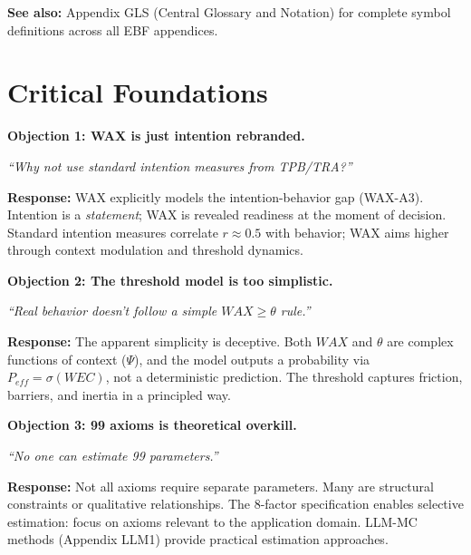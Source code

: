 \textbf{See also:} Appendix GLS (Central Glossary and Notation) for complete symbol definitions across all EBF appendices.


\section{Critical Foundations}
\label{sec:av-foundations}

\begin{tcolorbox}[colback=red!5!white, colframe=red!75!black,
    title=\textbf{Critical Foundations: Objections and Responses}]

\textbf{Objection 1: WAX is just intention rebranded.}

\textit{``Why not use standard intention measures from TPB/TRA?''}

\textbf{Response:} WAX explicitly models the intention-behavior gap (WAX-A3).
Intention is a \emph{statement}; WAX is revealed readiness at the moment of decision.
Standard intention measures correlate $r \approx 0.5$ with behavior; WAX aims higher
through context modulation and threshold dynamics.

\medskip

\textbf{Objection 2: The threshold model is too simplistic.}

\textit{``Real behavior doesn't follow a simple $WAX \geq \theta$ rule.''}

\textbf{Response:} The apparent simplicity is deceptive. Both $WAX$ and $\theta$ are
complex functions of context ($\Psi$), and the model outputs a probability via
$P_{eff} = \sigma(WEC)$, not a deterministic prediction. The threshold captures
friction, barriers, and inertia in a principled way.

\medskip

\textbf{Objection 3: 99 axioms is theoretical overkill.}

\textit{``No one can estimate 99 parameters.''}

\textbf{Response:} Not all axioms require separate parameters. Many are structural
constraints or qualitative relationships. The 8-factor specification enables
selective estimation: focus on axioms relevant to the application domain.
LLM-MC methods (Appendix LLM1) provide practical estimation approaches.

\end{tcolorbox}

